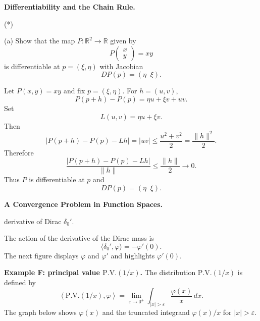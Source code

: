 \begin{problem}[CP-II-0552]
\label{prob:cp-ii-0552}
\textbf{Differentiability and the Chain Rule.}

\hspace*{1.5em}(*)

(a) Show that the map $P:\mathbb{R}^2\to\mathbb{R}$ given by
\[
P\!\begin{pmatrix}x\\y\end{pmatrix} = xy
\]
is differentiable at $p=(\xi,\eta)$ with Jacobian
\[
DP(p)=(\eta \;\; \xi).
\]
\end{problem}

\begin{solution}
Let \(P(x,y)=xy\) and fix \(p=(\xi,\eta)\). For \(h=(u,v)\),
\[
P(p+h)-P(p)=\eta u+\xi v+uv.
\]
Set
\[
L(u,v)=\eta u+\xi v.
\]
Then
\[
|P(p+h)-P(p)-Lh|=|uv|
\le\frac{u^2+v^2}{2}
=\frac{\|h\|^2}{2}.
\]
Therefore
\[
\frac{|P(p+h)-P(p)-Lh|}{\|h\|}
\le\frac{\|h\|}{2}\longrightarrow0.
\]
Thus \(P\) is differentiable at \(p\) and
\[
\boxed{DP(p)=(\eta\;\;\xi).}
\]
\end{solution}

\begin{problem}[CP-II-0559]
\label{prob:cp-ii-0559}
\textbf{A Convergence Problem in Function Spaces.}

\hspace*{1.5em}derivative of Dirac $\delta_0'$.

The action of the derivative of the Dirac mass is
\[
\langle\delta_0',\varphi\rangle = -\varphi'(0).
\]
The next figure displays $\varphi$ and $\varphi'$ and highlights
$\varphi'(0)$.

\par\medskip\noindent\textbf{Example F: principal value $\mathrm{P.V.}(1/x)$.}\quad
The distribution $\mathrm{P.V.}(1/x)$ is defined by
\[
\left\langle \mathrm{P.V.}(1/x), \varphi \right\rangle
= \lim_{\varepsilon\to0^+}
\int_{|x|>\varepsilon} \frac{\varphi(x)}{x}\,dx.
\]
The graph below shows $\varphi(x)$ and the truncated integrand
$\varphi(x)/x$ for $|x|>\varepsilon$.
\end{problem}

